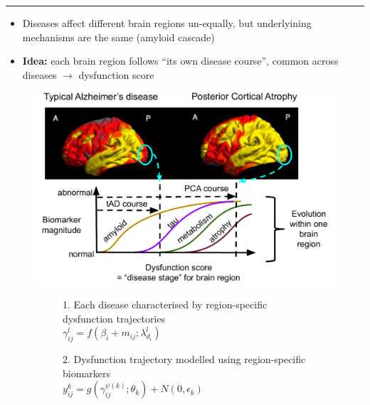 \documentclass[portrait,a0,final,20pt]{a0poster}
\newcommand{\fnt}[1]{\LARGE{#1}}
\begin{document}
{\begin{multicols}{2}
\end{multicols}
\hrule
\vspace{0.2em}

\begin{multicols}{2}							
\raggedcolumns	


\begin{itemize}
 \item Diseases affect different brain regions un-equally, but underlyining mechanisms are the same (amyloid cascade)
 \item \textbf{Idea:} each brain region follows ``its own disease course'', common across diseases $\rightarrow$ dysfunction score
\end{itemize}

\begin{figure}[H]
\centering
\includegraphics[width=1\columnwidth]{DKT_intuition}
 
\end{figure}


 
\vspace{0.6em}
\begin{figure}[H]
 \centering
   \begin{subfigure}{0.49\columnwidth}
   \centering
   \fnt{1. Each disease characterised by region-specific dysfunction trajectories}\\
   $ \gamma_{ij}^l = f(\beta_{i} + m_{ij}; \lambda_{d_i}^l) $\\
   
  \end{subfigure}
  \begin{subfigure}{0.49\columnwidth}
   \centering
   \fnt{2. Dysfunction trajectory modelled using region-specific biomarkers}\\
   $ y_{ij}^k = g( \gamma_{ij}^{\psi(k)} ; \theta_k) + N(0,\epsilon_k) $\\
   

\end{subfigure}
\end{figure}
\end{multicols}}
\end{document}
